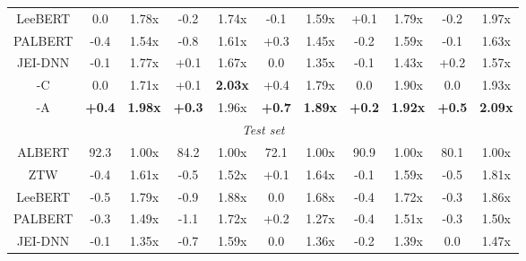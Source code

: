 \begin{table*}[]
\begin{tabular}{ccccccccccc}
LeeBERT                  & 0.0            & 1.78x          & -0.2          & 1.74x          & -0.1         & 1.59x          & +0.1         & 1.79x          & -0.2         & 1.97x          \\
PALBERT                  & -0.4         & 1.54x          & -0.8          & 1.61x          & +0.3          & 1.45x          & -0.2         & 1.59x          & -0.1         & 1.63x          \\

JEI-DNN                    & -0.1        & 1.77x          & +0.1          & 1.67x          & 0.0            & 1.35x          & -0.1         & 1.43x          & +0.2         & 1.57x          \\
\hline
\algo{}-C                    & 0.0         & 1.71x          & +0.1          & \textbf{2.03x}          & +0.4           & 1.79x          & 0.0         & 1.90x          & 0.0         & 1.93x          \\
\algo{}-A & \textbf{+0.4} & \textbf{1.98x} & \textbf{+0.3}  & 1.96x & \textbf{+0.7} & \textbf{1.89x} & \textbf{+0.2} & \textbf{1.92x} & \textbf{+0.5} & \textbf{2.09x} \\ \hline
\multicolumn{11}{c}{\textit{Test set}}                                                                                                                                                        \\ \hline
ALBERT                   & 92.3         & 1.00x             & 84.2          & 1.00x             & 72.1         & 1.00x             & 90.9         & 1.00x             & 80.1         & 1.00x             \\ \hline
ZTW        &  -0.4    &     1.61x       &  
      -0.5            &      1.52x    
   &      +0.1      &         1.64x   & -0.1       &       1.59x   &    -0.5  &     1.81x
         \\
LeeBERT                  & -0.5         & 1.79x          & -0.9          & 1.88x         & 0.0            & 1.68x          & -0.4         & 1.72x          & -0.3        & 1.86x          \\
PALBERT                  & -0.3         & 1.49x          & -1.1          & 1.72x          & +0.2          & 1.27x          & -0.4         & 1.51x          & -0.3         & 1.50x           \\
JEI-DNN                    & -0.1         & 1.35x          & -0.7          & 1.59x          & 0.0            & 1.36x          & -0.2         & 1.39x          & 0.0            & 1.47x          \\

\end{tabular}
\end{table*}
